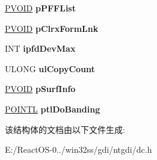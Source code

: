 \begin{DoxyCompactItemize}
\mbox{\label{struct___d_c_ae26d36b0feda0b1a9154c31de96ed19c}} 
\hyperlink{interfacevoid}{P\+V\+O\+ID} {\bfseries p\+P\+F\+F\+List}
\item 
\mbox{\label{struct___d_c_a7d05d2c5e22402fd4edce100187a7238}} 
\hyperlink{interfacevoid}{P\+V\+O\+ID} {\bfseries p\+Clrx\+Form\+Lnk}
\item 
\mbox{\label{struct___d_c_afe095749624204093e6f7b449fe67375}} 
I\+NT {\bfseries ipfd\+Dev\+Max}
\item 
\mbox{\label{struct___d_c_afdb30e8336d06f0aeacd36d97fc8e6ca}} 
U\+L\+O\+NG {\bfseries ul\+Copy\+Count}
\item 
\mbox{\label{struct___d_c_a27072cf54ad05f071f41e45ae8fc508b}} 
\hyperlink{interfacevoid}{P\+V\+O\+ID} {\bfseries p\+Surf\+Info}
\item 
\mbox{\label{struct___d_c_ae916407b7b466a5730c6a228b3baacbe}} 
\hyperlink{struct___p_o_i_n_t_l}{P\+O\+I\+N\+TL} {\bfseries ptl\+Do\+Banding}
\end{DoxyCompactItemize}


该结构体的文档由以下文件生成\+:\begin{DoxyCompactItemize}
\item 
E\+:/\+React\+O\+S-\/0../win32ss/gdi/ntgdi/dc.\+h\end{DoxyCompactItemize}
